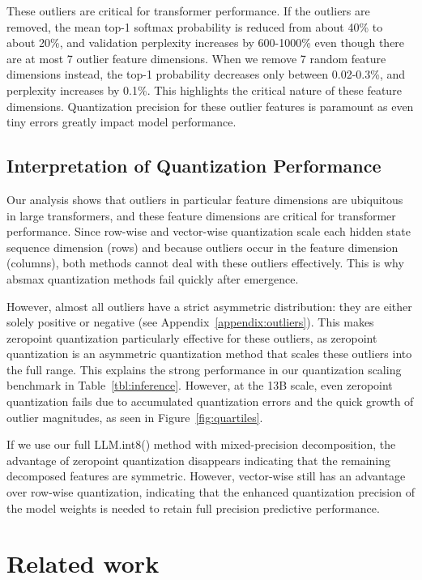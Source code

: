 \documentclass{article}
\begin{document}
These outliers are critical for transformer performance. If the outliers are removed, the mean top-1 softmax probability is reduced from about 40\% to about 20\%, and validation perplexity increases by 600-1000\% even though there are at most 7 outlier feature dimensions. When we remove 7 random feature dimensions instead, the top-1 probability decreases only between 0.02-0.3\%, and perplexity increases by 0.1\%. This highlights the critical nature of these feature dimensions. Quantization precision for these outlier features is paramount as even tiny errors greatly impact model performance.

\subsection{Interpretation of Quantization Performance}

Our analysis shows that outliers in particular feature dimensions are ubiquitous in large transformers, and these feature dimensions are critical for transformer performance.
Since row-wise and vector-wise quantization scale each hidden state sequence dimension  (rows) and because outliers occur in the feature dimension  (columns), both methods cannot deal with these outliers effectively. This is why absmax quantization methods fail quickly after emergence.

However, almost all outliers have a strict asymmetric distribution: they are either solely positive or negative (see Appendix~\ref{appendix:outliers}). This makes zeropoint quantization particularly effective for these outliers, as zeropoint quantization is an asymmetric quantization method that scales these outliers into the full  range. This explains the strong performance in our quantization scaling benchmark in Table~\ref{tbl:inference}. However, at the 13B scale, even zeropoint quantization fails due to accumulated quantization errors and the quick growth of outlier magnitudes, as seen in Figure~\ref{fig:quartiles}.

If we use our full LLM.int8() method with mixed-precision decomposition, the advantage of zeropoint quantization disappears indicating that the remaining decomposed features are symmetric. However, vector-wise still has an advantage over row-wise quantization, indicating that the enhanced quantization precision of the model weights is needed to retain full precision predictive performance.

\section{Related work}
\vspace{-1em}
\end{document}
